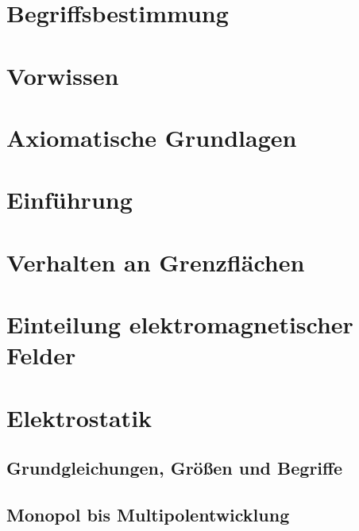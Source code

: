 
\usepackage{pdfpages}
\usepackage{fancyhdr}
\usepackage{xcolor}



\fancyfootoffset{-1.26cm}

\section{Begriffsbestimmung}

\section{Vorwissen}

\section{Axiomatische Grundlagen}

\section{Einführung}

\section{Verhalten an Grenzflächen}

\section{Einteilung elektromagnetischer Felder}

\section{Elektrostatik}
\subsection{Grundgleichungen, Größen und Begriffe}

\subsection{Monopol bis Multipolentwicklung}

